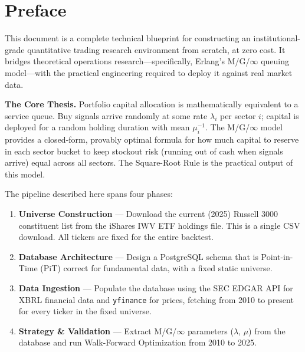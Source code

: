 \documentclass[11pt, oneside]{book}
\begin{document}
\chapter*{Preface}

This document is a complete technical blueprint for constructing an institutional-grade quantitative trading research environment from scratch, at zero cost. It bridges theoretical operations research---specifically, Erlang's M/G/$\infty$ queuing model---with the practical engineering required to deploy it against real market data.

\begin{institutionbox}
\textbf{The Core Thesis.} Portfolio capital allocation is mathematically equivalent to a service queue. Buy signals arrive randomly at some rate $\lambda_i$ per sector $i$; capital is deployed for a random holding duration with mean $\mu_i^{-1}$. The M/G/$\infty$ model provides a closed-form, provably optimal formula for how much capital to reserve in each sector bucket to keep stockout risk (running out of cash when signals arrive) equal across all sectors. The Square-Root Rule is the practical output of this model.
\end{institutionbox}

The pipeline described here spans four phases:
\begin{enumerate}[leftmargin=*, label=\textbf{Phase \arabic*.}]
    \item \textbf{Universe Construction} --- Download the current (2025) Russell 3000 constituent list from the iShares IWV ETF holdings file. This is a single CSV download. All tickers are fixed for the entire backtest.
    \item \textbf{Database Architecture} --- Design a PostgreSQL schema that is Point-in-Time (PiT) correct for fundamental data, with a fixed static universe.
    \item \textbf{Data Ingestion} --- Populate the database using the SEC EDGAR API for XBRL financial data and \texttt{yfinance} for prices, fetching from 2010 to present for every ticker in the fixed universe.
    \item \textbf{Strategy \& Validation} --- Extract M/G/$\infty$ parameters ($\lambda$, $\mu$) from the database and run Walk-Forward Optimization from 2010 to 2025.
\end{enumerate}
\end{document}
